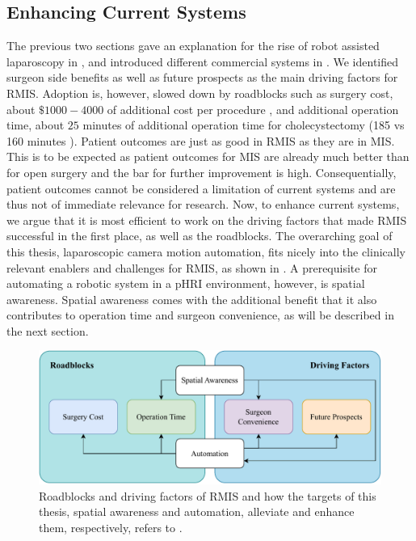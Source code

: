 \subsection{Enhancing Current Systems}
\label{in:sec:enhancing_current_systems}
The previous two sections gave an explanation for the rise of robot assisted laparoscopy in , and introduced different commercial systems in . We identified surgeon side benefits as well as future prospects as the main driving factors for RMIS. Adoption is, however, slowed down by roadblocks such as surgery cost, about $\$1000-4000$ of additional cost per procedure \cite{neumann2018qalys}, and additional operation time, about $25$ minutes of additional operation time for cholecystectomy (185 vs 160 minutes \cite{kane2020robotic}). Patient outcomes are just as good in RMIS as they are in MIS. This is to be expected as patient outcomes for MIS are already much better than for open surgery and the bar for further improvement is high. Consequentially, patient outcomes cannot be considered a limitation of current systems and are thus not of immediate relevance for research. Now, to enhance current systems, we argue that it is most efficient to work on the driving factors that made RMIS successful in the first place, as well as the roadblocks. The overarching goal of this thesis, laparoscopic camera motion automation, fits nicely into the clinically relevant enablers and challenges for RMIS, as shown in . A prerequisite for automating a robotic system in a pHRI environment, however, is spatial awareness. Spatial awareness comes with the additional benefit that it also contributes to operation time and surgeon convenience, as will be described in the next section.
\begin{figure}[tb]
    \centering
    \includegraphics[width=\textwidth]{introduction/fig/main_goals.pdf}
    \caption{Roadblocks and driving factors of RMIS and how the targets of this thesis, spatial awareness and automation, alleviate and enhance them, respectively, refers to .}
    \label{in:fig:advancing_robotic_laparoscopy}
\end{figure}

